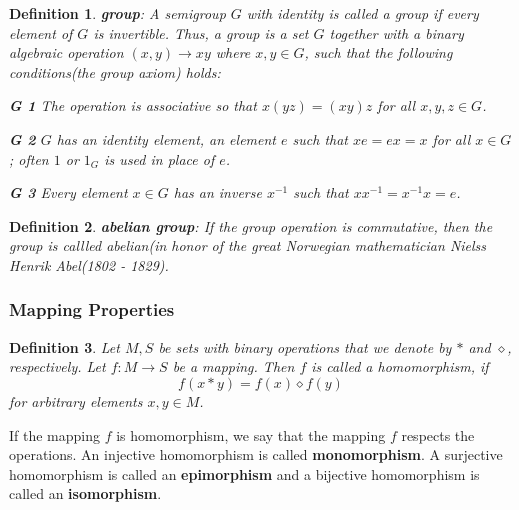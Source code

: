 \documentclass[a4paper]{book}
\newtheorem{definition}{Definition}[section]
\begin{document}
    \begin{definition}
      \textbf{group}: A semigroup $G$ with identity is called a group if
      every element of $G$ is invertible. Thus, a group is a set $G$
      together with a binary algebraic operation $(x,y) \rightarrow xy$
      where $x,y \in G$, such that the following conditions(the group axiom)
      holds:\cite{dixon2011algebra}
      \begin{compactitem}
      \item \textbf{G 1} The operation is associative so that $x(yz) =
        (xy)z$ for all $x,y,z \in G$.
      \item \textbf{G 2} $G$ has an identity element, an element $e$ such
        that $xe = ex = x$ for all $x \in G$; often $1$ or $1_G$ is used in
        place of $e$.
      \item \textbf{G 3} Every element $x \in G$ has an inverse $x^{-1}$
        such that $xx^{-1} = x^{-1}x = e$.
      \end{compactitem}
    \end{definition}

    \begin{definition}
      \textbf{abelian group}: If the group operation is commutative, then
      the group is callled abelian(in honor of the great Norwegian
      mathematician Nielss Henrik Abel(1802 - 1829).\cite{dixon2011algebra}
    \end{definition}

    \subsubsection{Mapping Properties}

    \begin{definition}
      Let $M, S$ be sets with binary operations that we denote by $\ast$ and
      $\diamond$, respectively. Let $ f:M \rightarrow S $ be a mapping. Then
      $f$ is called a homomorphism, if 
      \begin{displaymath}
        f(x\ast y) = f(x) \diamond f(y)
      \end{displaymath}
      for arbitrary elements $x,y \in M$.\cite{dixon2011algebra}
    \end{definition}

    If the mapping $f$ is homomorphism, we say that the mapping $f$
    respects the operations. An injective homomorphism is called
    \textbf{monomorphism}. A surjective homomorphism is called an
    \textbf{epimorphism} and a bijective homomorphism is called an
    \textbf{isomorphism}.\cite{dixon2011algebra}
\end{document}
